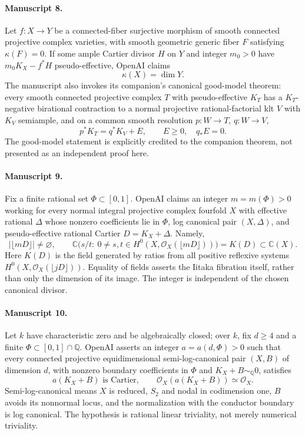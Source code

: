 \documentclass[11pt]{article}
\begin{document}
\paragraph{Manuscript 8.}
Let $f:X\to Y$ be a connected-fiber surjective morphism of smooth connected projective complex varieties, with smooth geometric generic fiber $F$ satisfying $\kappa(F)=0$. If some ample Cartier divisor $H$ on $Y$ and integer $m_0>0$ have $m_0K_X-f^*H$ pseudo-effective, OpenAI claims
\[
\kappa(X)=\dim Y.
\]
The manuscript also invokes its companion's canonical good-model theorem: every smooth connected projective complex $T$ with pseudo-effective $K_T$ has a $K_T$-negative birational contraction to a normal projective rational-factorial klt $V$ with $K_V$ semiample, and on a common smooth resolution $p:W\to T$, $q:W\to V$,
\[
p^*K_T=q^*K_V+E,\qquad E\ge0,\quad q_*E=0.
\]
The good-model statement is explicitly credited to the companion theorem, not presented as an independent proof here.

\paragraph{Manuscript 9.}
Fix a finite rational set $\Phi\subset[0,1]$. OpenAI claims an integer $m=m(\Phi)>0$ working for every normal integral projective complex fourfold $X$ with effective rational $\Delta$ whose nonzero coefficients lie in $\Phi$, log canonical pair $(X,\Delta)$, and pseudo-effective rational Cartier $D=K_X+\Delta$. Namely,
\[
|\lfloor mD\rfloor|\ne\varnothing,\qquad
\mathbb C\bigl(s/t:\ 0\ne s,t\in H^0(X,\mathcal O_X(\lfloor mD\rfloor))\bigr)=K(D)\subset\mathbb C(X).
\]
Here $K(D)$ is the field generated by ratios from all positive reflexive systems $H^0(X,\mathcal O_X(\lfloor jD\rfloor))$. Equality of fields asserts the Iitaka fibration itself, rather than only the dimension of its image. The integer is independent of the chosen canonical divisor.

\paragraph{Manuscript 10.}
Let $k$ have characteristic zero and be algebraically closed; over $k$, fix $d\ge4$ and a finite $\Phi\subset[0,1]\cap\mathbb Q$. OpenAI asserts an integer $a=a(d,\Phi)>0$ such that every connected projective equidimensional semi-log-canonical pair $(X,B)$ of dimension $d$, with nonzero boundary coefficients in $\Phi$ and $K_X+B\sim_{\mathbb Q}0$, satisfies
\[
a(K_X+B)\text{ is Cartier},\qquad \mathcal O_X(a(K_X+B))\simeq\mathcal O_X.
\]
Semi-log-canonical means $X$ is reduced, $S_2$ and nodal in codimension one, $B$ avoids its nonnormal locus, and the normalization with the conductor boundary is log canonical. The hypothesis is rational linear triviality, not merely numerical triviality.
\end{document}
